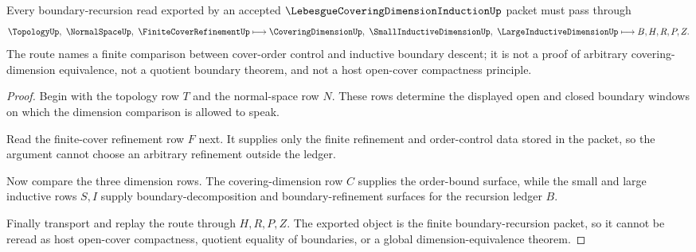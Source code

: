 \begin{theorem}
\label{thm:lebesgue-covering-dimension-induction-boundary-route}
Every boundary-recursion read exported by an accepted $\LebesgueCoveringDimensionInductionUp$ packet must pass through
$$
\TopologyUp,\ \NormalSpaceUp,\ \FiniteCoverRefinementUp
\longmapsto
\CoveringDimensionUp,\ \SmallInductiveDimensionUp,\ \LargeInductiveDimensionUp
\longmapsto
B,H,R,P,Z .
$$
The route names a finite comparison between cover-order control and inductive boundary descent; it is not a proof of arbitrary covering-dimension equivalence, not a quotient boundary theorem, and not a host open-cover compactness principle.
\end{theorem}
\begin{proof}
Begin with the topology row $T$ and the normal-space row $N$. These rows determine the displayed open and closed boundary windows on which the dimension comparison is allowed to speak.

Read the finite-cover refinement row $F$ next. It supplies only the finite refinement and order-control data stored in the packet, so the argument cannot choose an arbitrary refinement outside the ledger.

Now compare the three dimension rows. The covering-dimension row $C$ supplies the order-bound surface, while the small and large inductive rows $S,I$ supply boundary-decomposition and boundary-refinement surfaces for the recursion ledger $B$.

Finally transport and replay the route through $H,R,P,Z$. The exported object is the finite boundary-recursion packet, so it cannot be reread as host open-cover compactness, quotient equality of boundaries, or a global dimension-equivalence theorem.
\end{proof}



